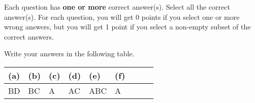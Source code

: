 
Each question has \textbf{one or more} correct answer(s). Select all the correct answer(s). For each question, you will get 0 points if you select one or more wrong answers, but you will get 1 point if you select a non-empty subset of the correct answers.

Write your answers in the following table.


\begin{table}[htbp]
	\centering
	\begin{tabular}{|p{1.7cm}|p{1.7cm}|p{1.7cm}|p{1.7cm}|p{1.7cm}|p{1.7cm}|p{1.7cm}|p{1.7cm}|p{1.7cm}|}
		\hline
		(a)       & (b)       & (c)      & (d)       & (e)        & (f)      \\
		\hline
		\hfill BD & \hfill BC & \hfill A & \hfill AC & \hfill ABC & \hfill A \\
		\hline
	\end{tabular}
\end{table}


